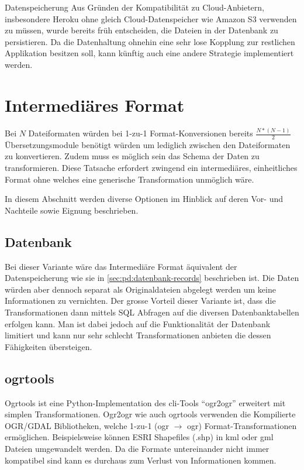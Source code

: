 \begin{decision}[label=dec:pd:datenspeicherung]{Datenspeicherung}
Aus Gründen der Kompatibilität zu Cloud-Anbietern, insbesondere Heroku ohne gleich Cloud-Datenspeicher wie Amazon S3 verwenden zu müssen, wurde bereits früh entscheiden, die Dateien in der Datenbank zu persistieren. Da die Datenhaltung ohnehin eine sehr lose Kopplung zur restlichen Applikation besitzen soll, kann künftig auch eine andere Strategie implementiert werden.
\end{decision}

\section{Intermediäres Format}

Bei $N$ Dateiformaten würden bei 1-zu-1 Format-Konversionen bereits $\frac{N*(N-1)}2$ Übersetzungsmodule benötigt würden um lediglich zwischen den Dateiformaten zu konvertieren. Zudem muss es möglich sein das Schema der Daten zu transformieren. Diese Tatsache erfordert zwingend ein intermediäres, einheitliches Format ohne welches eine generische Transformation unmöglich wäre.

In diesem Abschnitt werden diverse Optionen im Hinblick auf deren Vor- und Nachteile sowie Eignung beschrieben. 

\subsection{Datenbank}
Bei dieser Variante wäre das Intermediäre Format äquivalent der Datenspeicherung wie sie in \cref{sec:pd:datenbank-records} beschrieben ist. Die Daten würden aber dennoch separat als Originaldateien abgelegt werden um keine Informationen zu vernichten. Der grosse Vorteil dieser Variante ist, dass die Transformationen dann mittels SQL Abfragen auf die diversen Datenbanktabellen erfolgen kann. Man ist dabei jedoch auf die Funktionalität der Datenbank limitiert und kann nur sehr schlecht Transformationen anbieten die dessen Fähigkeiten übersteigen.


\subsection{ogrtools}

Ogrtools ist eine Python-Implementation des \acs{cli}-Tools ``ogr2ogr'' erweitert mit simplen Transformationen. Ogr2ogr wie auch ogrtools verwenden die Kompilierte OGR/GDAL Bibliotheken, welche 1-zu-1 (ogr $\to$ ogr) Format-Transformationen ermöglichen. Beispielsweise können ESRI Shapefiles (.shp) in \gls{kml} oder \gls{gml} Dateien umgewandelt werden. Da die Formate untereinander nicht immer kompatibel sind kann es durchaus zum Verlust von Informationen kommen.


